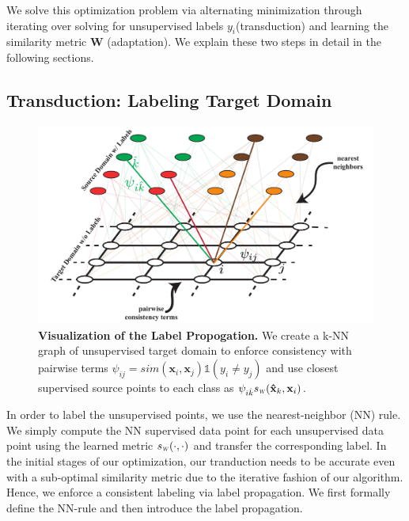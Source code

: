 We solve this optimization problem via alternating minimization through iterating over solving for unsupervised labels $y_i$(transduction) and learning the similarity metric $\mathbf{W}$ (adaptation). We explain these two steps in detail in the following sections.

 


\subsection{Transduction: Labeling Target Domain}
\label{label}
\begin{figure}[ht]
\includegraphics[width=\columnwidth]{fig11}
\vspace{-6mm}
\caption{\textbf{Visualization of the Label Propogation.} We create a k-NN graph of unsupervised target domain to enforce consistency with pairwise terms 
\mbox{$\psi_{ij}=sim(\mathbf{x}_i, \mathbf{x}_j) \mathds{1}(y_i \neq y_j)$} and use closest supervised source points to each class as 
\mbox{$ \psi_{i\hat{k}} \sw(\mathbf{\hat{x}}_k,\mathbf{x}_{i})$}.} 
\label{vis_label_prop}
\end{figure}
In order to label the unsupervised points, we use the nearest-neighbor (NN) rule. We simply compute the NN supervised data point for each unsupervised data point using the learned metric $\sw(\cdot,\cdot)$ and transfer the corresponding label. In the initial stages of our optimization, our tranduction needs to be accurate even with a sub-optimal similarity metric due to the iterative fashion of our algorithm. Hence, we enforce a consistent labeling via label propagation. We first formally define the NN-rule and then introduce the label propagation.

